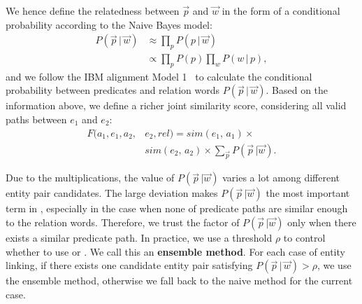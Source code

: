 We hence define the relatedness between $\vec{p}$ and $\vec{w}$ 
in the form of a conditional probability according to the Naive Bayes model:
\begin{equation}
\begin{aligned}
    P(\vec{p}\, |\, \vec{w}) & \approx \prod\nolimits_p P(p\, |\, \vec{w})  \\
                        & \propto \prod\nolimits_p P(p) \prod\nolimits_w P(w\, |\, p),
\end{aligned}
\end{equation}
\noindent
and we follow the IBM alignment Model 1~\cite{yao2014information} to calculate the conditional probability
between predicates and relation words $P(\vec{p}\, |\, \vec{w})$.
Based on the information above, we define a richer joint similarity score, 
considering all valid
paths between $e_1$ and $e_2$:
\begin{equation} \label{eqn:full}
\begin{aligned}
F(a_1, e_1,a_2,&e_2,rel) = sim(e_1,\, a_1) \times\\
               &sim(e_2,\, a_2) \times
		\sum\nolimits_{\vec{p}} P(\vec{p}\,| \vec{w}).
\end{aligned}
\end{equation}

Due to the multiplications, the value of $P(\vec{p}\,| \vec{w})$ varies a lot 
among different entity pair candidates. The large deviation makes 
$P(\vec{p}\,| \vec{w})$ the most important term in , 
especially in the case when none of predicate paths
are similar enough to the relation words.
Therefore, we trust the factor of $P(\vec{p}\,| \vec{w})$ only when 
there exists a similar predicate path.
In practice, we use a threshold $\rho$ to control whether to 
use  or .
We call this an \textbf{ensemble method}.
For each case of entity linking, if there exists one candidate entity pair satisfying $P(\vec{p}\, |\, \vec{w}) > \rho$,
we use the ensemble method, otherwise we fall back to the naive method for the current case.




